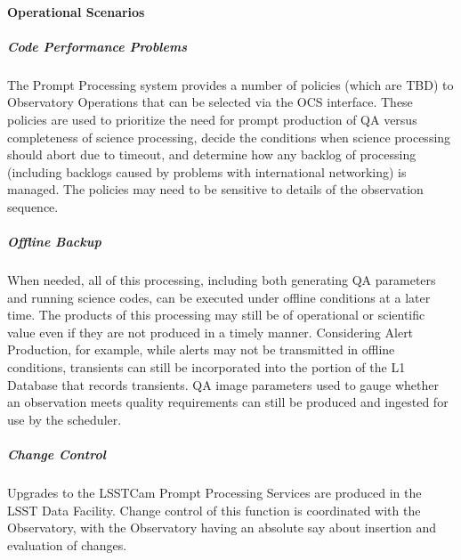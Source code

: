 \paragraph{Operational Scenarios}

\subparagraph{Code Performance Problems}
The Prompt Processing system
provides a number of policies (which are TBD) to Observatory
Operations that can be selected via the OCS interface.  These policies
are used to prioritize the need for prompt production of QA versus
completeness of science processing, decide the conditions when science
processing should abort due to timeout, and determine how any backlog
of processing (including backlogs caused by problems with
international networking) is managed.  The policies may need to be
sensitive to details of the observation sequence.

\subparagraph{Offline Backup}
When needed, all of this processing, including both generating QA
parameters and running science codes, can be executed under offline
conditions at a later time.  The products of
this processing may still be of operational or scientific value even
if they are not produced in a timely manner.  Considering Alert
Production, for example, while alerts may not be transmitted in
offline conditions, transients can still be incorporated into the
portion of the L1 Database that records transients.  QA image
parameters used to gauge whether an observation meets quality
requirements can still be produced and ingested for use by the scheduler.

\subparagraph{Change Control}
Upgrades to the LSSTCam Prompt Processing Services are produced in the LSST Data Facility. Change control
of this function is coordinated with the Observatory, with the Observatory having an absolute say
about insertion and evaluation of changes.

